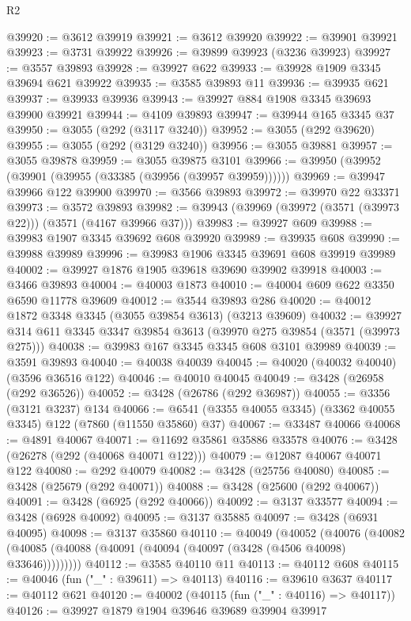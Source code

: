 \begin{lexlean}{R2}
\begin{coremodule}
@39920 := @3612 @39919
@39921 := @3612 @39920
@39922 := @39901 @39921
@39923 := @3731 @39922
@39926 := @39899 @39923 (@3236 @39923)
@39927 := @3557 @39893
@39928 := @39927 @622
@39933 := @39928 @1909 @3345 @39694 @621 @39922
@39935 := @3585 @39893 @11
@39936 := @39935 @621
@39937 := @39933 @39936
@39943 := @39927 @884 @1908 @3345 @39693 @39900 @39921
@39944 := @4109 @39893
@39947 := @39944 @165 @3345 @37
@39950 := @3055 (@292 (@3117 @3240))
@39952 := @3055 (@292 @39620)
@39955 := @3055 (@292 (@3129 @3240))
@39956 := @3055 @39881
@39957 := @3055 @39878
@39959 := @3055 @39875 @3101
@39966 := @39950 (@39952 (@39901 (@39955 (@33385 (@39956 (@39957 @39959))))))
@39969 := @39947 @39966 @122 @39900
@39970 := @3566 @39893
@39972 := @39970 @22 @33371
@39973 := @3572 @39893
@39982 := @39943 (@39969 (@39972 (@3571 (@39973 @22))) (@3571 (@4167 @39966 @37)))
@39983 := @39927 @609
@39988 := @39983 @1907 @3345 @39692 @608 @39920
@39989 := @39935 @608
@39990 := @39988 @39989
@39996 := @39983 @1906 @3345 @39691 @608 @39919 @39989
@40002 := @39927 @1876 @1905 @39618 @39690 @39902 @39918
@40003 := @3466 @39893
@40004 := @40003 @1873
@40010 := @40004 @609 @622 @3350 @6590 @11778 @39609
@40012 := @3544 @39893 @286
@40020 := @40012 @1872 @3348 @3345 (@3055 @39854 @3613) (@3213 @39609)
@40032 := @39927 @314 @611 @3345 @3347 @39854 @3613 (@39970 @275 @39854 (@3571 (@39973 @275)))
@40038 := @39983 @167 @3345 @3345 @608 @3101 @39989
@40039 := @3591 @39893
@40040 := @40038 @40039
@40045 := @40020 (@40032 @40040) (@3596 @36516 @122)
@40046 := @40010 @40045
@40049 := @3428 (@26958 (@292 @36526))
@40052 := @3428 (@26786 (@292 @36987))
@40055 := @3356 (@3121 @3237) @134
@40066 := @6541 (@3355 @40055 @3345) (@3362 @40055 @3345) @122 (@7860 (@11550 @35860) @37)
@40067 := @33487 @40066
@40068 := @4891 @40067
@40071 := @11692 @35861 @35886 @33578
@40076 := @3428 (@26278 (@292 (@40068 @40071 @122)))
@40079 := @12087 @40067 @40071 @122
@40080 := @292 @40079
@40082 := @3428 (@25756 @40080)
@40085 := @3428 (@25679 (@292 @40071))
@40088 := @3428 (@25600 (@292 @40067))
@40091 := @3428 (@6925 (@292 @40066))
@40092 := @3137 @33577
@40094 := @3428 (@6928 @40092)
@40095 := @3137 @35885
@40097 := @3428 (@6931 @40095)
@40098 := @3137 @35860
@40110 := @40049
    (@40052
      (@40076 (@40082 (@40085 (@40088 (@40091 (@40094 (@40097 (@3428 (@4506 @40098) @33646)))))))))
@40112 := @3585 @40110 @11
@40113 := @40112 @608
@40115 := @40046 (fun ("_" : @39611) => @40113)
@40116 := @39610 @3637
@40117 := @40112 @621
@40120 := @40002 (@40115 (fun ("_" : @40116) => @40117))
@40126 := @39927 @1879 @1904 @39646 @39689 @39904 @39917

\end{coremodule}
\end{lexlean}
